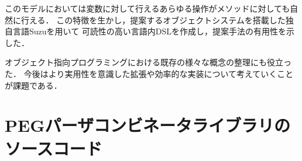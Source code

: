 \documentclass{ipsjprosym}
\begin{document}
このモデルにおいては変数に対して行えるあらゆる操作がメソッドに対しても自然に行える．
この特徴を生かし，提案するオブジェクトシステムを搭載した独自言語Suzuを用いて
可読性の高い言語内DSLを作成し，提案手法の有用性を示した．

オブジェクト指向プログラミングにおける既存の様々な概念の整理にも役立った．
今後はより実用性を意識した拡張や効率的な実装について考えていくことが課題である．






\onecolumn

\appendix

\section{PEGパーザコンビネータライブラリのソースコード}
\label{sec:peg-source}
\end{document}
